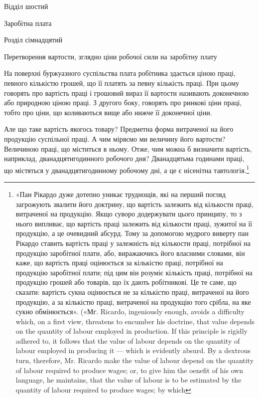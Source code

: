 Відділ шостий

Заробітна плата

Розділ сімнадцятий

Перетворення вартости, зглядно ціни робочої
сили на заробітну плату

На поверхні буржуазного суспільства плата робітника здається
ціною праці, певного кількістю грошей, що її платять за
певну кількість праці. При цьому говорять про вартість праці
і грошовий вираз її вартости називають доконечною або природною
ціною праці. З другого боку, говорять про ринкові ціни
праці, тобто про ціни, що коливаються вище або нижче її доконечної
ціни.

Але що таке вартість якогось товару? Предметна форма витраченої
на його продукцію суспільної праці. А чим міряємо
ми величину його вартости? Величиною праці, що міститься
в ньому. Отже, чим можна б визначити вартість, наприклад,
дванадцятигодинного робочого дня? Дванадцятьма годинами
праці, що містяться у дванадцятигодинному робочому дні, а це
є нісенітна тавтологія.\footnote{
«Пан Рікардо дуже дотепно уникає труднощів, які на перший
погляд загрожують звалити його доктрину, що вартість залежить від
кількости праці, витраченої на продукцію. Якщо суворо додержувати
цього принципу, то з нього випливає, що вартість праці залежить від
кількости праці, зужитої на її продукцію, а це очевидний абсурд. Тому
за допомогою мудрого виверту пан Рікардо ставить вартість праці у
залежність від кількости праці, потрібної на продукцію заробітної плати,
або, виражаючись його власними словами, він каже, що вартість праці
оцінюється за кількістю праці, потрібної на продукцію заробітної плати;
під цим він розуміє кількість праці, потрібної на продукцію грошей або
товарів, що їх дають робітникові. Це те саме, що сказати: вартість сукна
оцінюється не за кількістю праці, витраченої на його продукцію, а за
кількістю праці, витраченої на продукцію того срібла, на яке сукно
обмінюється». («Мг. Ricardo, ingeniously enough, avoids a difficulty
which, on a first view, threatens to encumber his doctrine, that value depends
on the quantity of labour employed in production. If this principle
is rigidly adhered to, it follows that the value of labour depends on the
quantity of labour employed in producing it — which is evidently absurd.
By a dextrous turn, therefore, Mr. Ricardo make the value of labour depend
on the quantity of labour required to produce wages; or, to give him the
oenefit of his own language, he maintains, that the value of labour is to
be estimated by the quantity of labour required to produce wages; by which
}

